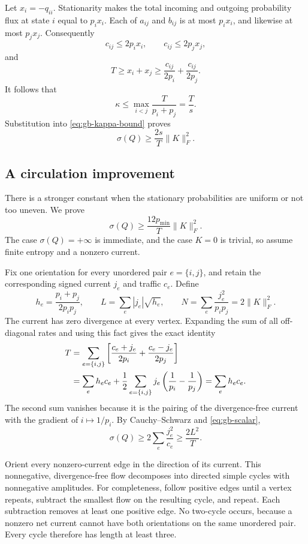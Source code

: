 Let $x_i=-q_{ii}$. Stationarity makes the total incoming and outgoing
probability flux at state $i$ equal to $p_ix_i$. Each of $a_{ij}$ and
$b_{ij}$ is at most $p_ix_i$, and likewise at most $p_jx_j$.
Consequently
\[
 c_{ij}\leq2p_ix_i,\qquad c_{ij}\leq2p_jx_j,
\]
and
\[
 T\geq x_i+x_j\geq
 \frac{c_{ij}}{2p_i}+\frac{c_{ij}}{2p_j}.
\]
It follows that
\[
 \kappa\leq\max_{i<j}\frac{T}{p_i+p_j}=\frac Ts.
\]
Substitution into \eqref{eq:gb-kappa-bound} proves
\begin{equation}
 \sigma(Q)\geq\frac{2s}{T}\|K\|_F^2.
 \label{eq:gb-simple-constant}
\end{equation}

\subsection{A circulation improvement}

There is a stronger constant when the stationary probabilities are
uniform or not too uneven. We prove
\begin{equation}
 \sigma(Q)\geq\frac{12p_{\min}}{T}\|K\|_F^2.
 \label{eq:gb-circulation-constant}
\end{equation}
The case $\sigma(Q)=+\infty$ is immediate, and the case $K=0$ is
trivial, so assume finite entropy and a nonzero current.

Fix one orientation for every unordered pair $e=\{i,j\}$, and retain
the corresponding signed current $j_e$ and traffic $c_e$. Define
\[
 h_e=\frac{p_i+p_j}{2p_ip_j},\qquad
 L=\sum_e |j_e|\sqrt{h_e},\qquad
 N=\sum_e\frac{j_e^2}{p_ip_j}=2\|K\|_F^2.
\]
The current has zero divergence at every vertex. Expanding the sum of
all off-diagonal rates and using this fact gives the exact identity
\begin{align}
 T&=\sum_{e=\{i,j\}}
 \left[\frac{c_e+j_e}{2p_i}+\frac{c_e-j_e}{2p_j}\right]\notag\\
 &=\sum_e h_ec_e+
 \frac12\sum_{e=\{i,j\}}j_e\left(\frac1{p_i}-\frac1{p_j}\right)
 =\sum_e h_ec_e.
 \label{eq:gb-weighted-traffic}
\end{align}
The second sum vanishes because it is the pairing of the
divergence-free current with the gradient of $i\mapsto1/p_i$.
By Cauchy--Schwarz and \eqref{eq:gb-scalar},
\begin{equation}
 \sigma(Q)\geq2\sum_e\frac{j_e^2}{c_e}
 \geq\frac{2L^2}{T}.
 \label{eq:gb-lone-bound}
\end{equation}

Orient every nonzero-current edge in the direction of its current.
This nonnegative, divergence-free flow decomposes into directed simple
cycles with nonnegative amplitudes. For completeness, follow positive
edges until a vertex repeats, subtract the smallest flow on the
resulting cycle, and repeat. Each subtraction removes at least one
positive edge. No two-cycle occurs, because a nonzero net current
cannot have both orientations on the same unordered pair. Every
cycle therefore has length at least three.

